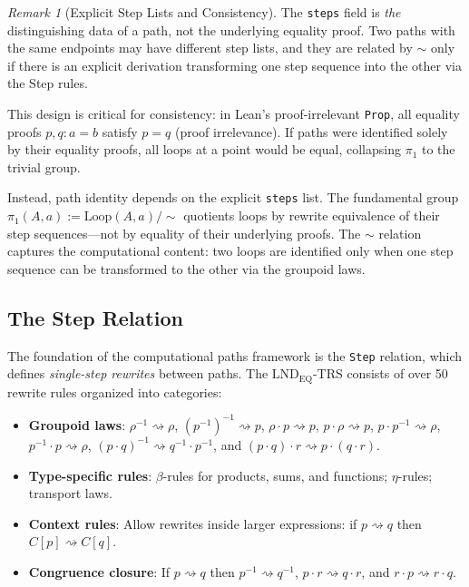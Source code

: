 \documentclass{lmcs}
\theoremstyle{definition}
\theoremstyle{plain}
\theoremstyle{remark}
\newtheorem{remark}[definition]{Remark}
\newcommand{\refl}{\rho}
\newcommand{\Rw}{\rightsquigarrow}
\newcommand{\RwEq}{\sim}
\newcommand{\piOne}{\pi_1}
\newcommand{\Loop}{\mathrm{Loop}}
\begin{document}
\begin{remark}[Explicit Step Lists and Consistency]
\label{rem:consistency}
The \texttt{steps} field is \emph{the} distinguishing data of a path, not the underlying equality proof. Two paths with the same endpoints may have different step lists, and they are related by $\RwEq$ only if there is an explicit derivation transforming one step sequence into the other via the Step rules.

This design is critical for consistency: in Lean's proof-irrelevant \texttt{Prop}, all equality proofs $p, q : a = b$ satisfy $p = q$ (proof irrelevance). If paths were identified solely by their equality proofs, all loops at a point would be equal, collapsing $\piOne$ to the trivial group.

Instead, path identity depends on the explicit \texttt{steps} list. The fundamental group $\piOne(A, a) := \Loop(A, a) / {\RwEq}$ quotients loops by rewrite equivalence of their step sequences---not by equality of their underlying proofs. The $\RwEq$ relation captures the computational content: two loops are identified only when one step sequence can be transformed to the other via the groupoid laws.
\end{remark}

\subsection{The Step Relation}

The foundation of the computational paths framework is the \texttt{Step} relation, which defines \emph{single-step rewrites} between paths. The $\mathrm{LND}_{\mathrm{EQ}}$-TRS consists of over 50 rewrite rules organized into categories:

\begin{itemize}
    \item \textbf{Groupoid laws}: $\refl^{-1} \Rw \refl$, $(p^{-1})^{-1} \Rw p$, $\refl \cdot p \Rw p$, $p \cdot \refl \Rw p$, $p \cdot p^{-1} \Rw \refl$, $p^{-1} \cdot p \Rw \refl$, $(p \cdot q)^{-1} \Rw q^{-1} \cdot p^{-1}$, and $(p \cdot q) \cdot r \Rw p \cdot (q \cdot r)$.
    \item \textbf{Type-specific rules}: $\beta$-rules for products, sums, and functions; $\eta$-rules; transport laws.
    \item \textbf{Context rules}: Allow rewrites inside larger expressions: if $p \Rw q$ then $C[p] \Rw C[q]$.
    \item \textbf{Congruence closure}: If $p \Rw q$ then $p^{-1} \Rw q^{-1}$, $p \cdot r \Rw q \cdot r$, and $r \cdot p \Rw r \cdot q$.
\end{itemize}
\end{document}

